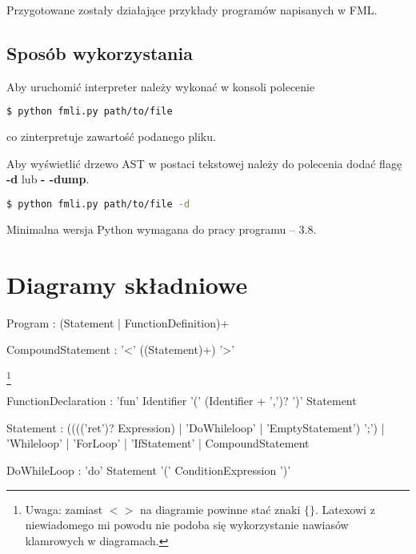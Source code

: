 \documentclass[12pt,a4paper]{article}
\begin{document}
Przygotowane zostały działające przykłady programów napisanych w FML.

\subsection{Sposób wykorzystania}

Aby uruchomić interpreter należy wykonać w konsoli polecenie

\begin{lstlisting}[language=bash]
  $ python fmli.py path/to/file
\end{lstlisting}

\noindent co zinterpretuje zawartość podanego pliku.

\smallbreak

Aby wyświetlić drzewo AST w postaci tekstowej należy do polecenia dodać flagę \textbf{-d} lub \textbf{- -dump}.

\begin{lstlisting}[language=bash]
  $ python fmli.py path/to/file -d
\end{lstlisting}

Minimalna wersja Python wymagana do pracy programu -- 3.8. 


\section{Diagramy składniowe}

\begin{rail}
Program : (Statement | FunctionDefinition)+
\end{rail}

\begin{rail}
CompoundStatement : '<' ((Statement)+) '>'
\end{rail} \footnote{Uwaga: zamiast \textbf{$< >$} na diagramie powinne stać znaki \textbf{$\{ \}$}. Latexowi z niewiadomego mi powodu nie podoba się wykorzystanie nawiasów klamrowych w diagramach.}

\begin{rail}
FunctionDeclaration : 'fun' Identifier '(' (Identifier + ',')?  ')' Statement
\end{rail}

\begin{rail}
Statement : (((('ret')? Expression) | 'DoWhileloop' | 'EmptyStatement') ';') | 'Whileloop' | 'ForLoop' | 'IfStatement' | CompoundStatement
\end{rail}

\begin{rail}
DoWhileLoop : 'do' Statement '(' ConditionExpression ')'
\end{rail}
\end{document}
